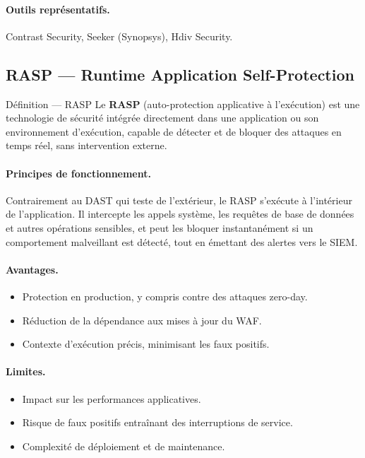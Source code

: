 \paragraph{Outils représentatifs.}
Contrast Security, Seeker (Synopsys), Hdiv Security.

\subsection{RASP --- Runtime Application Self-Protection}

\begin{definitionbox}{Définition --- RASP}
  Le \textbf{RASP} (auto-protection applicative à l'exécution) est une technologie
  de sécurité intégrée directement dans une application ou son environnement
  d'exécution, capable de détecter et de bloquer des attaques en temps réel,
  sans intervention externe.
\end{definitionbox}

\paragraph{Principes de fonctionnement.}
Contrairement au DAST qui teste de l'extérieur, le RASP s'exécute à l'intérieur
de l'application. Il intercepte les appels système, les requêtes de base de données
et autres opérations sensibles, et peut les bloquer instantanément si un comportement
malveillant est détecté, tout en émettant des alertes vers le SIEM.

\paragraph{Avantages.}
\begin{itemize}
  \item Protection en production, y compris contre des attaques zero-day.
  \item Réduction de la dépendance aux mises à jour du WAF.
  \item Contexte d'exécution précis, minimisant les faux positifs.
\end{itemize}

\paragraph{Limites.}
\begin{itemize}
  \item Impact sur les performances applicatives.
  \item Risque de faux positifs entraînant des interruptions de service.
  \item Complexité de déploiement et de maintenance.
\end{itemize}

